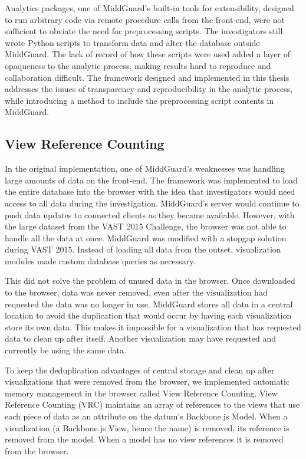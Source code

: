 \documentclass[midd]{thesis}
\begin{document}
Analytics packages, one of MiddGuard's built-in tools for extensibility,
designed to run arbitrary code via remote procedure calls from the front-end,
were not sufficient to obviate the need for preprocessing scripts. The
investigators still wrote Python scripts to transform data and alter the
database outside MiddGuard. The lack of record of how these scripts were used
added a layer of opaqueness to the analytic process, making results hard to
reproduce and collaboration difficult. The framework designed and implemented in
this thesis addresses the issues of transparency and reproducibility in the
analytic process, while introducing a method to include the preprocessing script
contents in MiddGuard.

\subsection{View Reference Counting}

In the original implementation, one of MiddGuard's weaknesses was handling
large amounts of data on the front-end. The framework was implemented to load
the entire database into the browser with the idea that investigators would need
access to all data during the investigation. MiddGuard's server would continue
to push data updates to connected clients as they became available. However,
with the large dataset from the VAST 2015 Challenge, the browser was not able to
handle all the data at once. MiddGuard was modified with a stopgap solution
during VAST 2015. Instead of loading all data from the outset, visualization
modules made custom database queries as necessary.

This did not solve the problem of unused data in the browser. Once downloaded to
the browser, data was never removed, even after the visualization had requested
the data was no longer in use. MiddGuard stores all data in a central location
to avoid the duplication that would occur by having each visualization store its
own data. This makes it impossible for a visualization that has requested data
to clean up after itself. Another visualization may have requested and currently
be using the same data.

To keep the deduplication advantages of central storage and clean up after
visualizations that were removed from the browser, we implemented automatic
memory management in the browser called View Reference Counting. View Reference
Counting (VRC) maintains an array of references to the views that use each piece
of data as an attribute on the datum's Backbone.js Model. When a visualization
(a Backbone.js View, hence the name) is removed, its reference is removed from
the model. When a model has no view references it is removed from the browser.
\end{document}
